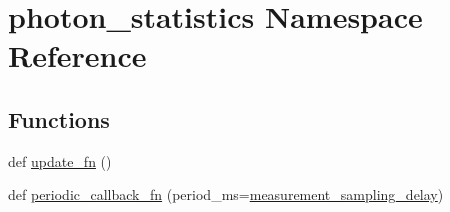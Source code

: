 \hypertarget{namespacephoton__statistics}{}\section{photon\+\_\+statistics Namespace Reference}
\label{namespacephoton__statistics}
\subsection*{Functions}
\begin{DoxyCompactItemize}
\item 
def \hyperlink{namespacephoton__statistics_ad67c22ae3d8b73d690282b77915fa984}{update\+\_\+fn} ()
\item 
def \hyperlink{namespacephoton__statistics_a3d8a4bcc1566dd71aab0925749e1416f}{periodic\+\_\+callback\+\_\+fn} (period\+\_\+ms=\hyperlink{namespacephoton__statistics_ab809da8a53764aea064814bd4abdba42}{measurement\+\_\+sampling\+\_\+delay})
\end{DoxyCompactItemize}
